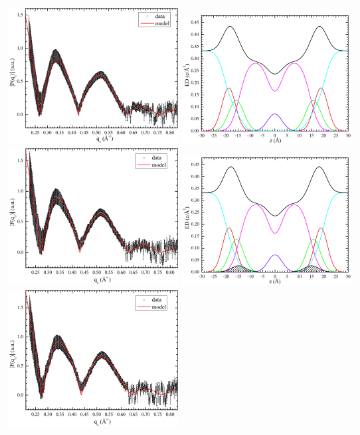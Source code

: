 \begin{figure}[htbp]
  \centering
  \includegraphics[width=0.4\textwidth]{figures/Tat/SDP_Results/XFF/DOPCDOPE1to1_XFF1}
  \includegraphics[width=0.4\textwidth]{./figures/Tat/SDP_Results/EDP/DOPCDOPE1to1_EDP1}
  \includegraphics[width=0.4\textwidth]{figures/Tat/SDP_Results/XFF/DOPCDOPE1to1_Tat_62to1_3p0_XFF1}
  \includegraphics[width=0.4\textwidth]{./figures/Tat/SDP_Results/EDP/DOPCDOPE1to1_Tat_62to1_3p0_EDP1}
  \includegraphics[width=0.4\textwidth]{figures/Tat/SDP_Results/XFF/DOPCDOPE1to1_Tat_28to1_3p0_XFF1}

\end{figure}
